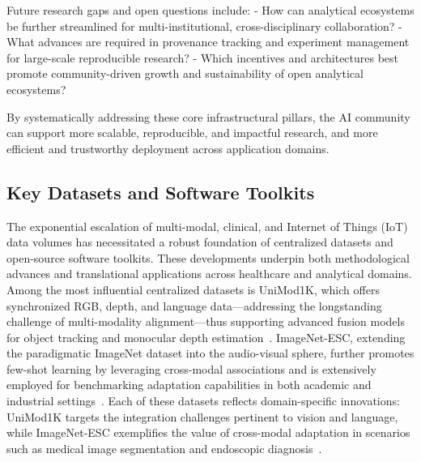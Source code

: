 \documentclass[sigconf]{acmart}
\begin{document}
Future research gaps and open questions include:
- How can analytical ecosystems be further streamlined for multi-institutional, cross-disciplinary collaboration?
- What advances are required in provenance tracking and experiment management for large-scale reproducible research?
- Which incentives and architectures best promote community-driven growth and sustainability of open analytical ecosystems?

By systematically addressing these core infrastructural pillars, the AI community can support more scalable, reproducible, and impactful research, and more efficient and trustworthy deployment across application domains.

\subsection{Key Datasets and Software Toolkits}

The exponential escalation of multi-modal, clinical, and Internet of Things (IoT) data volumes has necessitated a robust foundation of centralized datasets and open-source software toolkits. These developments underpin both methodological advances and translational applications across healthcare and analytical domains. Among the most influential centralized datasets is UniMod1K, which offers synchronized RGB, depth, and language data---addressing the longstanding challenge of multi-modality alignment---thus supporting advanced fusion models for object tracking and monocular depth estimation~\cite{ref100}. ImageNet-ESC, extending the paradigmatic ImageNet dataset into the audio-visual sphere, further promotes few-shot learning by leveraging cross-modal associations and is extensively employed for benchmarking adaptation capabilities in both academic and industrial settings~\cite{ref67,ref49}. Each of these datasets reflects domain-specific innovations: UniMod1K targets the integration challenges pertinent to vision and language, while ImageNet-ESC exemplifies the value of cross-modal adaptation in scenarios such as medical image segmentation and endoscopic diagnosis~\cite{ref67,ref49,ref43}.
\end{document}

